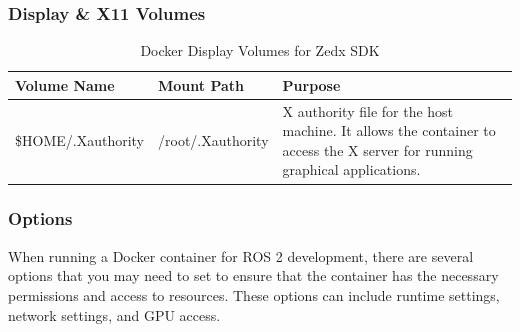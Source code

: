 \begin{landscape}
\subsubsection{Display \& X11 Volumes}

\begin{table}[H]
    \centering
    \begin{tabular}{|l|l|p{9cm}|}
        \hline
        \textbf{Volume Name} & \textbf{Mount Path} & \textbf{Purpose} \\
        \hline
        \${HOME}/.Xauthority & /root/.Xauthority & X authority file for the host machine. It allows the container to access the X server for running graphical applications. \\
        \hline
    \end{tabular}
    \caption{Docker Display Volumes for Zedx SDK}
    \label{tab:docker-volumes-display}
\end{table}

\end{landscape}

\subsubsection{Options}

When running a Docker container for ROS 2 development, there are several options that you may need to set to ensure that the container has the necessary permissions and access to resources. These options can include runtime settings, network settings, and GPU access.

